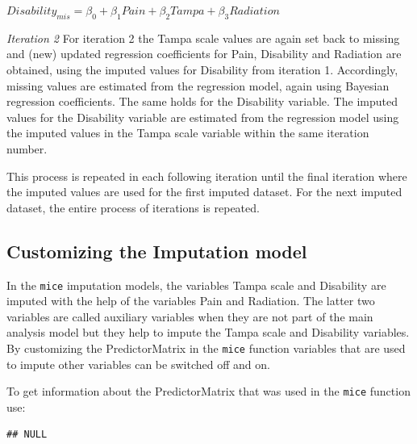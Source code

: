 \documentclass[]{book}
\newenvironment{Shaded}{\begin{snugshade}}{\end{snugshade}}
\newcommand{\OperatorTok}[1]{\textcolor[rgb]{0.81,0.36,0.00}{\textbf{#1}}}
\newcommand{\NormalTok}[1]{#1}
\begin{document}
\(Disability_{mis} = \beta_0 + \beta_1Pain + \beta_2Tampa + \beta_3Radiation\)

\emph{Iteration 2} For iteration 2 the Tampa scale values are again set
back to missing and (new) updated regression coefficients for Pain,
Disability and Radiation are obtained, using the imputed values for
Disability from iteration 1. Accordingly, missing values are estimated
from the regression model, again using Bayesian regression coefficients.
The same holds for the Disability variable. The imputed values for the
Disability variable are estimated from the regression model using the
imputed values in the Tampa scale variable within the same iteration
number.

This process is repeated in each following iteration until the final
iteration where the imputed values are used for the first imputed
dataset. For the next imputed dataset, the entire process of iterations
is repeated.

\subsection{Customizing the Imputation
model}\label{customizing-the-imputation-model}

In the \texttt{mice} imputation models, the variables Tampa scale and
Disability are imputed with the help of the variables Pain and
Radiation. The latter two variables are called auxiliary variables when
they are not part of the main analysis model but they help to impute the
Tampa scale and Disability variables. By customizing the PredictorMatrix
in the \texttt{mice} function variables that are used to impute other
variables can be switched off and on.

To get information about the PredictorMatrix that was used in the
\texttt{mice} function use:

\begin{Shaded}
\end{Shaded}

\begin{verbatim}
## NULL
\end{verbatim}
\end{document}
